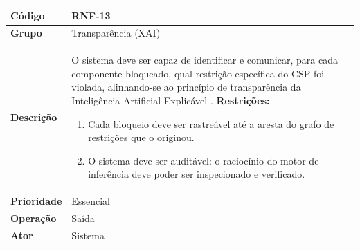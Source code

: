 \FloatBarrier
\begin{quadro}[htb]
  \caption{RNF-13 -- Rastreabilidade de cada bloqueio até a restrição violada}
  \label{quad:rnf13}
  \begin{tabular}{|p{3.2cm}|p{11.8cm}|}
    \hline
    \textbf{Código}     & RNF-13                                                                                       \\ \hline
    \textbf{Grupo}      & Transparência (XAI)                                                                          \\ \hline
    \textbf{Descrição}  &
    O sistema deve ser capaz de identificar e comunicar, para cada componente bloqueado, qual restrição específica do CSP foi violada, alinhando-se ao princípio de transparência da Inteligência Artificial Explicável \cite{Arrieta2020}.
    \textbf{Restrições:}
    \begin{enumerate}[nosep,leftmargin=1.2em,topsep=2pt,partopsep=0pt,parsep=0pt,itemsep=1pt]
      \item Cada bloqueio deve ser rastreável até a aresta do grafo de restrições que o originou.
      \item O sistema deve ser auditável: o raciocínio do motor de inferência deve poder ser inspecionado e verificado.
    \end{enumerate} \\ \hline
    \textbf{Prioridade} & Essencial                                                                                    \\ \hline
    \textbf{Operação}   & Saída                                                                                        \\ \hline
    \textbf{Ator}       & Sistema                                                                                      \\ \hline
  \end{tabular}
\end{quadro}

